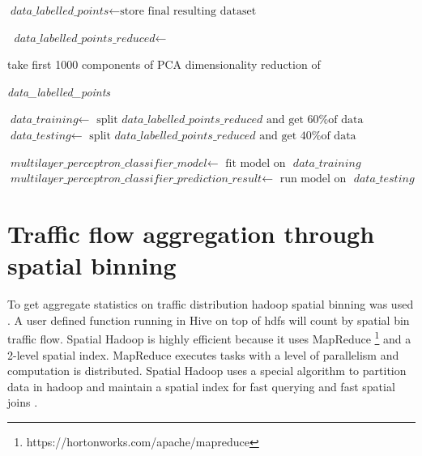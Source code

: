 \documentclass[12pt, a4paper]{report}
\theoremstyle{definition}
\theoremstyle{definition}%
\theoremstyle{definition}%
\theoremstyle{definition}%
\theoremstyle{definition}%
\theoremstyle{definition}%
\begin{document}
\begin{algorithm}[!t]
\begin{algorithmic} [1]
			\item[]
			
			\State $\textit{data\_labelled\_points} \gets \text{store final resulting dataset}$
			
			\State $\textit{ data\_labelled\_points\_reduced} \gets$ \par 
					take first 1000 components of PCA dimensionality reduction of \par 
					\textit{ data\_labelled\_points}
			
			\State $\textit{data\_training} 	\gets$  $ \text{split } \textit{data\_labelled\_points\_reduced} \text{ and get 60\% of data }$
			\State $\textit{data\_testing} 	    \gets$  $ \text{split } \textit{data\_labelled\_points\_reduced} \text{ and get 40\% of data }$
			
			\State $\textit{multilayer\_perceptron\_classifier\_model} 	\gets$  $\text{fit model on } \textit{ data\_training}$	
			\State $\textit{multilayer\_perceptron\_classifier\_prediction\_result} 	\gets$  $\text{run model on } \textit{ data\_testing}$	
			\State {}
					
			
		\EndIndent 	
		
	
		
		
		

	\end{algorithmic}
\end{algorithm}

\newpage{}


\section{Traffic flow aggregation through spatial binning}

To get aggregate statistics on traffic distribution hadoop spatial binning was used \cite{Eldawy}. A user defined function running in Hive on top of hdfs will count by spatial bin traffic flow. Spatial Hadoop is highly efficient because it uses MapReduce \footnote{https://hortonworks.com/apache/mapreduce} and a 2-level spatial index. MapReduce executes tasks with a level of parallelism and computation is distributed. Spatial Hadoop uses a special algorithm to partition data in hadoop and maintain a spatial index for fast querying and fast spatial joins \cite{Eldawy}.
\end{document}
